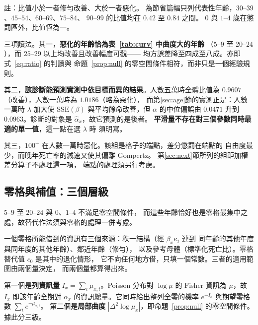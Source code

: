 \documentclass[UTF8, fontset=macnew, a4paper, 12pt]{ctexart}
\begin{document}
\begin{table}[H]
\vspace{2pt}
\parbox{0.92\textwidth}{\footnotesize 註：比值小於一者修勻改善、大於一者惡化。
為節省篇幅只列代表性年齡，$30$--$39$、$45$--$54$、$60$--$69$、$75$--$84$、
$90$--$99$ 的比值均在 $0.42$ 至 $0.84$ 之間。
$0$ 與 $1$--$4$ 歲在懲罰區外，比值恆為一。}
\label{tab:exante}
\end{table}

三項讀法。其一，\textbf{惡化的年齡恰為表~\ref{tab:curv} 中曲度大的年齡}
（$5$--$9$ 至 $20$--$24$），而 $25$--$29$ 以上均改善且改善幅度可觀——
均方誤差降至四成至八成。亦即式~\eqref{eq:ratio} 的判讀與
命題~\ref{prop:null} 的零空間條件相符，而非只是一個經驗規則。

其二，\textbf{該診斷能預測實測中依目標而異的結果}。人數五萬時全體比值為
$0.9607$（改善），人數一萬時為 $1.0186$（略為惡化），
而第\ref{sec:age}節的實測正是：人數一萬時 $\lambda$ 加大使
$\mathrm{SSE}(\beta)$ 與平均餘命改善，但 $\alpha$ 的中位偏誤由
$0.0471$ 升到 $0.0963$。診斷的對象是 $\hat\alpha_x$，故它預測的是後者。
\textbf{平滑量不存在對三個參數同時最適的單一值}，這一點在選 $\lambda$ 時
須明寫。

其三，$100^{+}$ 在人數一萬時惡化。該組是格子的端點，差分懲罰在端點的
自由度最少，而晚年死亡率的減速又使其偏離 Gompertz。
第\ref{sec:next}節所列的組距加權差分算子不處理這一項，
端點的處理須另行考慮。

\subsection{零格與補值：三個層級}\label{subsec:tiers}

$5$--$9$ 至 $20$--$24$ 與 $0$、$1$--$4$ 不滿足零空間條件，
而這些年齡恰好也是零格最集中之處，故替代作法須與零格的處理一併考慮。

一個零格所能借到的資訊有三個來源：秩一結構（經 $\beta_x\kappa_t$ 連到
同年齡的其他年度與同年度的其他年齡）、鄰近年齡（修勻），
以及參考母體（標準化死亡比）。零格替代值 $c_0$ 是其中的退化情形，
它不向任何地方借，只填一個常數。三者的適用範圍由兩個量決定，
而兩個量都算得出來。

第一個是\textbf{列資訊量} $I_x=\sum_t\mu_{x,t}$。Poisson 分布對
$\log\mu$ 的 Fisher 資訊為 $\mu$，故 $I_x$ 即該年齡全期對
$\alpha_x$ 的資訊總量。它同時給出整列全零的機率 $e^{-I_x}$
與期望零格數 $\sum_t e^{-\mu_{x,t}}$。
第二個是\textbf{局部曲度} $|\Delta^2\log\mu_x|$，即命題~\ref{prop:null}
的零空間條件。據此分三級。
\end{document}
